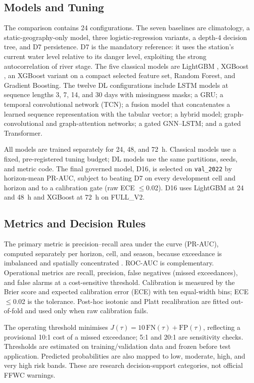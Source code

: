 \documentclass[conference]{IEEEtran}
\begin{document}
\subsection{Models and Tuning}

The comparison contains 24 configurations. The seven baselines are climatology, a static-geography-only model, three logistic-regression variants, a depth-4 decision tree, and D7 persistence. D7 is the mandatory reference: it uses the station's current water level relative to its danger level, exploiting the strong autocorrelation of river stage. The five classical models are LightGBM \cite{ke2017lightgbm}, XGBoost \cite{chen2016xgboost}, an XGBoost variant on a compact selected feature set, Random Forest, and Gradient Boosting. The twelve DL configurations include LSTM models at sequence lengths 3, 7, 14, and 30 days with missingness masks; a GRU; a temporal convolutional network (TCN); a fusion model that concatenates a learned sequence representation with the tabular vector; a hybrid model; graph-convolutional and graph-attention networks; a gated GNN--LSTM; and a gated Transformer.

All models are trained separately for 24, 48, and 72~h. Classical models use a fixed, pre-registered tuning budget; DL models use the same partitions, seeds, and metric code. The final governed model, D16, is selected on \texttt{val\_2022} by horizon-mean PR-AUC, subject to beating D7 on every development cell and horizon and to a calibration gate (raw ECE $\leq$0.02). D16 uses LightGBM at 24 and 48~h and XGBoost at 72~h on FULL\_V2.

\subsection{Metrics and Decision Rules}

The primary metric is precision--recall area under the curve (PR-AUC), computed separately per horizon, cell, and season, because exceedance is imbalanced and spatially concentrated \cite{saito2015precision}. ROC-AUC is complementary. Operational metrics are recall, precision, false negatives (missed exceedances), and false alarms at a cost-sensitive threshold. Calibration is measured by the Brier score and expected calibration error (ECE) with ten equal-width bins; ECE $\leq$0.02 is the tolerance. Post-hoc isotonic and Platt recalibration are fitted out-of-fold and used only when raw calibration fails.

The operating threshold minimises $J(\tau)=10\,\mathrm{FN}(\tau)+\mathrm{FP}(\tau)$, reflecting a provisional 10:1 cost of a missed exceedance; 5:1 and 20:1 are sensitivity checks. Thresholds are estimated on training/validation data and frozen before test application. Predicted probabilities are also mapped to low, moderate, high, and very high risk bands. These are research decision-support categories, not official FFWC warnings.
\end{document}
